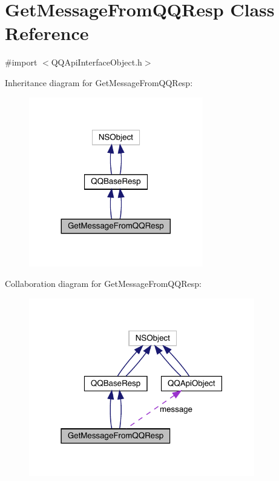 \hypertarget{interface_get_message_from_q_q_resp}{}\section{Get\+Message\+From\+Q\+Q\+Resp Class Reference}
\label{interface_get_message_from_q_q_resp}


{\ttfamily \#import $<$Q\+Q\+Api\+Interface\+Object.\+h$>$}



Inheritance diagram for Get\+Message\+From\+Q\+Q\+Resp\+:\nopagebreak
\begin{figure}[H]
\begin{center}
\leavevmode
\includegraphics[width=215pt]{interface_get_message_from_q_q_resp__inherit__graph}
\end{center}
\end{figure}


Collaboration diagram for Get\+Message\+From\+Q\+Q\+Resp\+:\nopagebreak
\begin{figure}[H]
\begin{center}
\leavevmode
\includegraphics[width=279pt]{interface_get_message_from_q_q_resp__coll__graph}
\end{center}
\end{figure}
